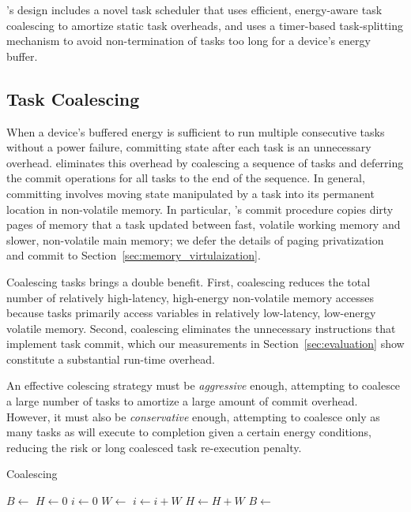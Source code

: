 \sys's design includes a novel task scheduler that uses efficient,
energy-aware task coalescing to amortize static task overheads, and uses a timer-based
task-splitting mechanism to avoid non-termination of tasks too long
for a device's energy buffer. 
% 
\subsection{Task Coalescing}
\label{sec:task_coalescing}
% 
When a device's buffered energy is sufficient to run multiple consecutive tasks
without a power failure, committing state after each task is an unnecessary
overhead. \sys eliminates this overhead by coalescing a sequence of tasks and deferring the commit
operations for all tasks to the end of the sequence. 
In general, committing involves moving state manipulated by a task
into its permanent location in non-volatile memory.  In particular, \sys's
commit procedure copies dirty pages of memory that a task updated between fast,
volatile working memory and slower, non-volatile main memory; we defer the
details of paging privatization and commit to Section~\ref{sec:memory_virtulaization}.

Coalescing tasks brings a double benefit. First, coalescing reduces the total number of relatively
high-latency, high-energy non-volatile memory accesses because tasks primarily
access variables in relatively low-latency, low-energy volatile memory.
Second, coalescing eliminates the unnecessary instructions that implement task
commit, which our measurements in Section~\ref{sec:evaluation} show constitute
a substantial run-time overhead.

An effective colescing strategy must be {\em aggressive} enough, attempting to coalesce a
large number of tasks to amortize a large amount of commit overhead. However, it must also be 
{\em conservative} enough, attempting to coalesce only as many tasks as will execute
to completion given a certain energy conditions, reducing the risk or long coalesced task re-execution penalty. 
%

\begin{algorithm}[t]
	\caption{Coalescing}
	\label{algo:genCoalescing}
	\scriptsize
	\begin{algorithmic}[1]
        \State $B \leftarrow $ 
        \State $H \gets 0$ 
	        \State $ i \gets 0$
		        \State {}
		        \State $W \leftarrow $ 
		        \State $i \gets i + W$
				\State $H \gets H + W$
	        \EndWhile
	        \State {}
	        \State $B \leftarrow $ 
        \EndWhile
	\end{algorithmic}
\end{algorithm}
% 
